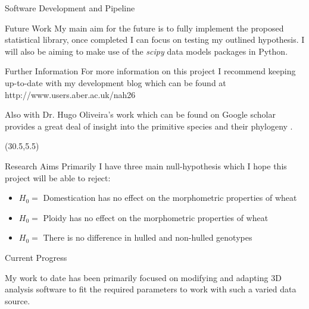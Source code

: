 \documentclass[final]{beamer}
\begin{document}
\begin{frame}{}
\begin{textblock}{28}
\begin{block}{Software Development and Pipeline}
\begin{multicols}{2}
      \end{multicols}




    \end{block}

    \begin{block}{Future Work}
      My main aim for the future is to fully implement the proposed statistical library,
      once completed I can focus on testing my outlined hypothesis.
      I will also be aiming to make use of the \textit{scipy}
      data models packages in Python.
    \end{block}

    
    \begin{block}{Further Information}
      For more information on this project I recommend keeping up-to-date with my development blog
      which can be found at  http://www.users.aber.ac.uk/nah26

      Also with Dr. Hugo Oliveira's work which can be found on Google scholar
      provides a great deal of insight into the primitive species
      and their phylogeny \cite{Oliveira2012}. 
      
    \end{block}


  \end{textblock}

  \begin{textblock}{28}(30.5,5.5)

    \begin{block}{Research Aims}
      Primarily I have three main null-hypothesis which I hope this project will be able to reject:

      \begin{itemize}
      \item{$H_0=$ Domestication has no effect on the morphometric properties of wheat}
      \item{$H_0=$ Ploidy has no effect on the morphometric properties of wheat}
      \item{$H_0=$ There is no difference in hulled and non-hulled genotypes}
      \end{itemize}
      
    \end{block}

    
    \begin{block}{Current Progress}

      My work to date has been primarily focused on modifying
      and adapting 3D analysis software to fit the required
      parameters to work with such a varied data source.


\end{block}
\end{textblock}
\end{frame}
\end{document}
